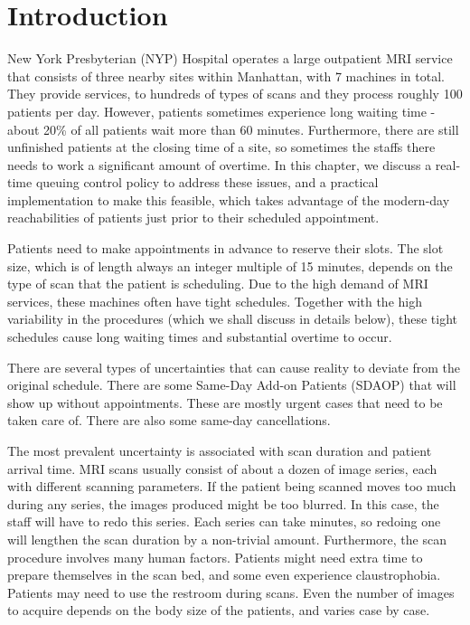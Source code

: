 \section{Introduction}

New York Presbyterian (NYP) Hospital operates a large outpatient MRI service that
consists of three nearby sites within Manhattan, with 7 machines in total.
They provide services, to hundreds of types of scans and they process roughly 100
patients per day. However, patients sometimes experience long waiting time
-about 20\% of all patients wait more than 60 minutes. Furthermore, there are
still unfinished patients at the closing time of a site,
so sometimes the staffs there needs to work a significant amount of overtime. In this chapter,
we discuss a real-time queuing control policy to address these issues,
and a practical implementation to make this feasible, which takes advantage
of the modern-day reachabilities of patients just prior to their scheduled
appointment.

Patients need to make appointments in advance to reserve their slots.
The slot size, which is of length always an integer multiple of 15 minutes,
depends on the type of scan that the patient is scheduling.
Due to the high demand of MRI services, these machines often have tight
schedules. Together with the high variability in the procedures (which we
shall discuss in details below), these tight schedules cause long waiting times
and substantial overtime to occur.

There are several types of uncertainties that can cause reality to
deviate from the original schedule. There are some Same-Day Add-on Patients (SDAOP)
that will show up without appointments. These are mostly urgent cases
that need to be taken care of. There are also some same-day cancellations.

The most prevalent uncertainty is associated with scan duration and
patient arrival time. MRI scans usually consist of about a dozen of
image series, each with different scanning parameters. If the patient
being scanned moves too much during any series, the images produced
might be too blurred. In this case, the staff will have to redo this series.
Each series can take minutes, so redoing one will lengthen the scan
duration by a non-trivial amount. Furthermore, the scan procedure involves
many human factors. Patients might need extra time to prepare themselves
in the scan bed, and some even experience claustrophobia. Patients may need to
use the restroom during scans. Even the number of images to acquire depends
on the body size of the patients, and varies case by case.

